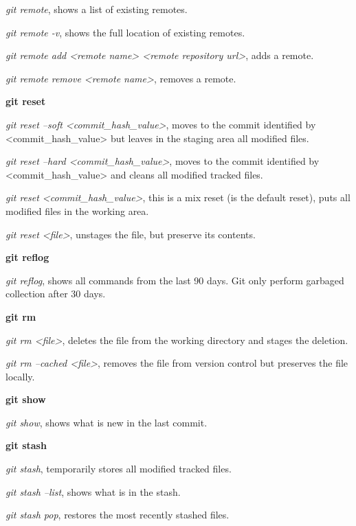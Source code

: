 \begin{refsection}
\noindent\emph{git remote}, shows a list of existing remotes.

\noindent\emph{git remote -v}, shows the full location of existing remotes.

\noindent\emph{git remote add <remote name> <remote repository url>}, adds a remote.

\noindent\emph{git remote remove <remote name>}, removes a remote.

\vspace*{5mm} \noindent \textbf{git reset}

\noindent\emph{git reset --soft <commit\_hash\_value>}, moves to the commit identified by <commit\_hash\_value> but leaves in the staging area all modified files.

\noindent\emph{git reset --hard <commit\_hash\_value>}, moves to the commit identified by <commit\_hash\_value> and cleans all modified tracked files.

\noindent\emph{git reset <commit\_hash\_value>}, this is a mix reset (is the default reset), puts all modified files in the working area.

\noindent\emph{git reset <file>}, unstages the file, but preserve its contents.

\vspace*{5mm} \noindent \textbf{git reflog}

\noindent\emph{git reflog}, shows all commands from the last 90 days. Git only perform garbaged collection after 30 days.

\vspace*{5mm} \noindent \textbf{git rm}

\noindent\emph{git rm <file>}, deletes the file from the working directory and stages the deletion.

\noindent\emph{git rm --cached <file>}, removes the file from version control but preserves the file locally.

\vspace*{5mm} \noindent \textbf{git show}

\noindent\emph{git show}, shows what is new in the last commit.

\vspace*{5mm} \noindent  \textbf{git stash}

\noindent\emph{git stash}, temporarily stores all modified tracked files.

\noindent\emph{git stash --list}, shows what is in the stash.

\noindent\emph{git stash pop}, restores the most recently stashed files.


\end{refsection}
